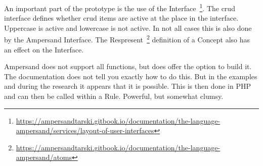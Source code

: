 An important part of the prototype is the use of the Interface~\footnote{\url{https://ampersandtarski.gitbook.io/documentation/the-language-ampersand/services/layout-of-user-interfaces}}.
The \acrshort{crud} interface defines whether \acrshort{crud} items are active at the place in the interface.
Uppercase is active and lowercase is not active.
In not all cases this is also done by the Ampersand Interface.
The Respresent~\footnote{\url{https://ampersandtarski.gitbook.io/documentation/the-language-ampersand/atoms}} definition of a Concept also has an effect on the Interface.

Ampersand does not support all functions, but does offer the option to build it.
The documentation does not tell you exactly how to do this.
But in the examples and during the research it appears that it is possible.
This is then done in PHP and can then be called within a Rule.
Powerful, but somewhat clumsy.